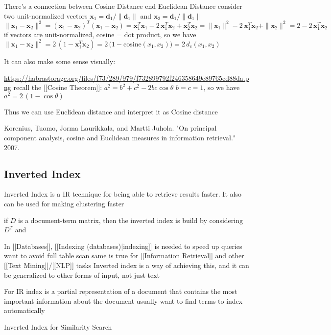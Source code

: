 There's a connection between Cosine Distance end Euclidean Distance
consider two unit-normalized vectors $\mathbf x_1 = \mathbf d_1 / \| \mathbf d_1 \|$ and $\mathbf x_2 = \mathbf d_1 / \| \mathbf d_1 \|$
$\| \mathbf x_1 - \mathbf x_2 \|^2 = (\mathbf x_1 - \mathbf x_2)^T (\mathbf x_1 - \mathbf x_2) = \mathbf x_1^T \mathbf x_1 - 2 \, \mathbf x_1^T \mathbf x_2 + \mathbf x_2^T \mathbf x_2 = \| \mathbf x_1 \|^2 - 2 \, \mathbf x_1^T \mathbf x_2 + \| \mathbf x_2 \|^2 = 2 - 2 \, \mathbf x_1^T \mathbf x_2$
if vectors are unit-normalized, cosine = dot product, so we have
$\| \mathbf x_1 - \mathbf x_2 \|^2 = 2 \, (1 -  \mathbf x_1^T \mathbf x_2) = 2 \, \big(1 - \text{cosine}(x_1, x_2)\big) = 2 \, d_c(x_1, x_2)$


It can also make some sense visually:


\url{https://habrastorage.org/files/f73/289/979/f732899792f246358649e89765cd88da.png}
recall the [[Cosine Theorem]]: $a^2 = b^2 + c^2 - 2 bc \cos \theta$
$b = c = 1$, so we have $a^2 = 2 \, (1 - \cos \theta)$


Thus we can use Euclidean distance and interpret it as Cosine distance


Korenius, Tuomo, Jorma Laurikkala, and Martti Juhola. "On principal component analysis, cosine and Euclidean measures in information retrieval." 2007.



\subsection{Inverted Index} \label{sec:index}

Inverted Index is a IR technique for being able to retrieve results faster. 
It also can be used for making clustering faster 

if $D$ is a document-term matrix, then the inverted index is build 
by considering $D^T$ and 

In [[Databases]], [[Indexing (databases)|indexing]] is needed to speed up queries
want to avoid full table scan
same is true for [[Information Retrieval]] and other [[Text Mining]]/[[NLP]] tasks
Inverted index is a way of achieving this, and it can be generalized to other forms of input, not just text


For IR
index is a partial representation of a document that contains the most important information about the document
usually want to find terms to index automatically




Inverted Index for Similarity Search 

